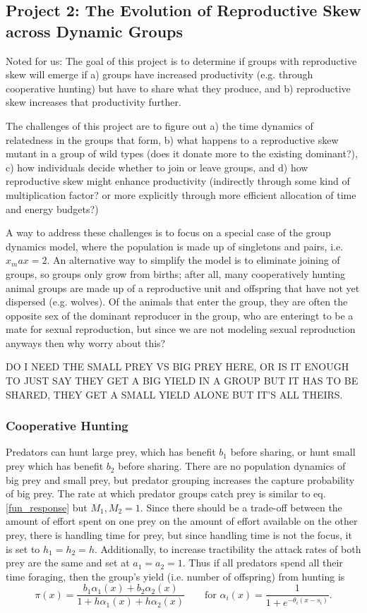 \subsection{Project 2: The Evolution of Reproductive Skew across Dynamic Groups}

Noted for us:
The goal of this project is to determine if groups with reproductive skew will emerge if a) groups have increased productivity (e.g. through cooperative hunting) but have to share what they produce, and b) reproductive skew increases that productivity further. 

The challenges of this project are to figure out a) the time dynamics of relatedness in the groups that form, b) what happens to a reproductive skew mutant in a group of wild types (does it donate more to the existing dominant?), c) how individuals decide whether to join or leave groups, and d) how reproductive skew might enhance productivity (indirectly through some kind of multiplication factor? or more explicitly through more efficient allocation of time and energy budgets?)

A way to address these challenges is to focus on a special case of the group dynamics model, where the population is made up of singletons and pairs, i.e. $x_max = 2$. An alternative way to simplify the model is to eliminate joining of groups, so groups only grow from births; after all, many cooperatively hunting animal groups are made up of a reproductive unit and offspring that have not yet dispersed (e.g. wolves). Of the animals that enter the group, they are often the opposite sex of the dominant reproducer in the group, who are enteringt to be a mate for sexual reproduction, but since we are not modeling sexual reproduction anyways then why worry about this?


DO I NEED THE SMALL PREY VS BIG PREY HERE, OR IS IT ENOUGH TO JUST SAY THEY GET A BIG YIELD IN A GROUP BUT IT HAS TO BE SHARED, THEY GET A SMALL YIELD ALONE BUT IT'S ALL THEIRS.
\subsubsection{Cooperative Hunting}
Predators can hunt large prey, which has benefit $b_1$ before sharing, or hunt small prey which has benefit $b_2$ before sharing. There are no population dynamics of big prey and small prey, but predator grouping increases the capture probability of big prey. The rate at which predator groups catch prey is similar to eq. \ref{fun_response} but $M_1, M_2 = 1$. Since there should be a trade-off between the amount of effort spent on one prey on the amount of effort available on the other prey, there is handling time for prey, but since handling time is not the focus, it is set to $h_1 = h_2 = h$. Additionally, to increase tractibility the attack rates of both prey are the same and set at $a_1 = a_2 = 1$. Thus if all predators spend all their time foraging, then the group's yield (i.e. number of offspring) from hunting is
\begin{equation} \label{fun_response_2}
\pi(x) = \frac{b_1 \alpha_1(x) + b_2 \alpha_2(x)}{1 +  h \alpha_1(x) + h \alpha_2(x)} \qquad \text{for }
\alpha_i(x) = \frac{1}{1 + e^{-\theta_i(x - s_i)}}.
\end{equation}
